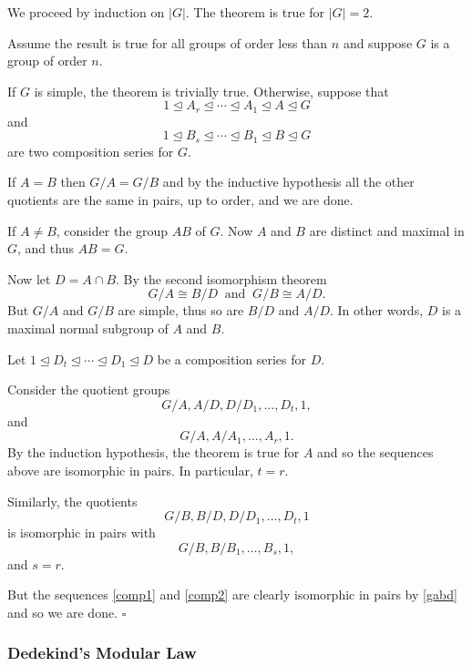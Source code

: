 \documentclass[10pt]{article}
\newenvironment{proof}[1][Proof]{\begin{trivlist}
\item[\hskip \labelsep {\itshape #1}]}{\end{trivlist}}
\begin{document}
\begin{proof}
We proceed by induction on $|G|$. The theorem is true for $|G| = 2$.

Assume the result is true for all groups of order less than $n$ and suppose $G$ is a group of order $n$.

If $G$ is simple, the theorem is trivially true. Otherwise, suppose that
$$1 \mathrel{\unlhd} A_r \mathrel{\unlhd} \cdots \mathrel{\unlhd} A_1 \mathrel{\unlhd} A \mathrel{\unlhd} G$$
and
$$1 \mathrel{\unlhd} B_s \mathrel{\unlhd} \cdots \mathrel{\unlhd} B_1 \mathrel{\unlhd} B \mathrel{\unlhd} G$$
are two composition series for $G$.

If $A = B$ then $G/A = G/B$ and by the inductive hypothesis all the other quotients are the same in pairs, up to order, and we are done.

If $A \neq B$, consider the group $AB$ of $G$. Now $A$ and $B$ are distinct and maximal in $G$, and thus $AB = G$.

Now let $D = A\cap B$. By the second isomorphism theorem 
\begin{equation}\label{gabd}
G/A \cong B/D\;\;\mbox{and}\;\;G/B \cong A/D.
\end{equation}
But $G/A$ and $G/B$ are simple, thus so are $B/D$ and $A/D$. In other words, $D$ is a maximal normal subgroup of $A$ and $B$.

Let $1 \mathrel{\unlhd} D_t \mathrel{\unlhd} \cdots \mathrel{\unlhd} D_1 \mathrel{\unlhd} D$ be a composition series for $D$.

Consider the quotient groups
\begin{equation}\label{comp1}G/A, A/D, D/D_1, \ldots, D_t, 1,\end{equation}
and
$$G/A, A/A_1, \ldots, A_r, 1.$$
By the induction hypothesis, the theorem is true for $A$ and so the sequences above are isomorphic in pairs. In particular, $t = r$.

Similarly, the quotients
\begin{equation}\label{comp2}G/B, B/D, D/D_1, \ldots, D_t, 1\end{equation}
is isomorphic in pairs with
$$G/B, B/B_1, \ldots, B_s, 1,$$
and $s = r$.

But the sequences \eqref{comp1} and \eqref{comp2} are clearly isomorphic in pairs by \eqref{gabd} and so we are done. $\square$
\end{proof}

\subsubsection{Dedekind's Modular Law}
\end{document}
